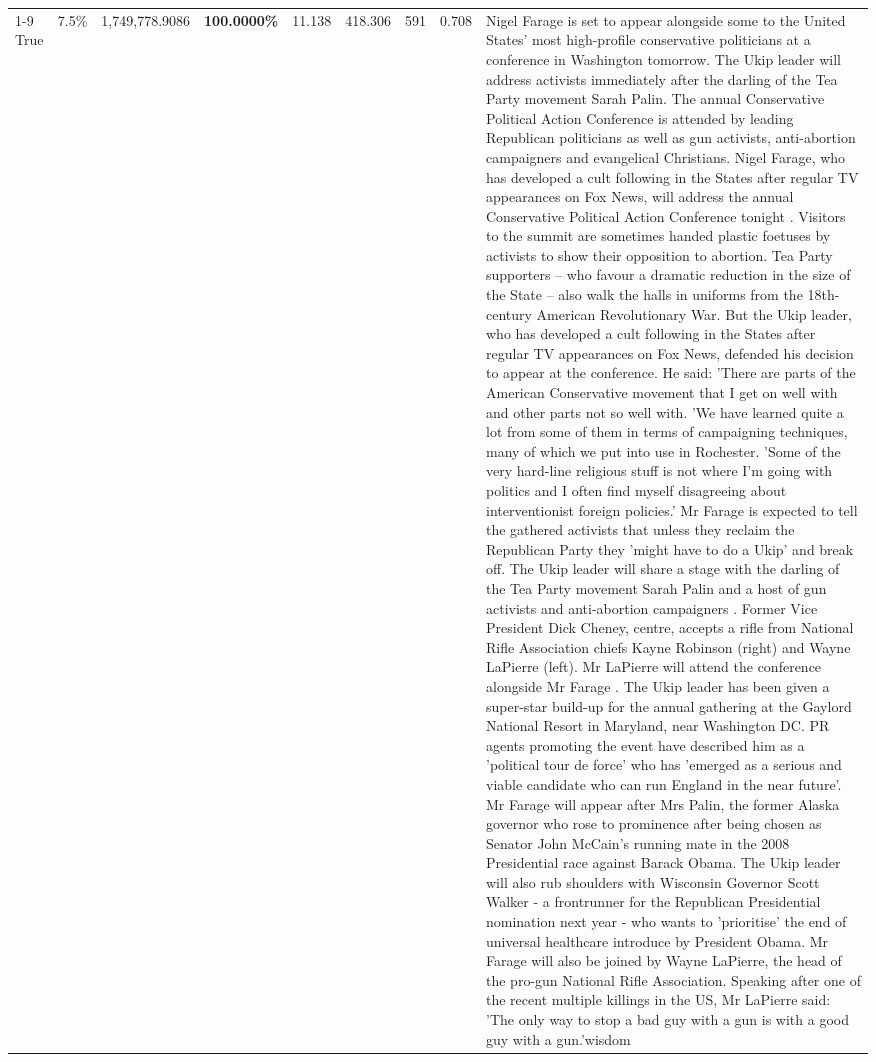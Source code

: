 \begin{table}[H]
\begin{tabular}{lllrlllll}
\cline{1-9}
True & 7.5\% & 1,749,778.9086 & \bfseries \color{red} 100.0000\% & 11.138 & 418.306 & 591 & 0.708 & Nigel Farage is set to appear alongside some to the United States' most high-profile conservative politicians at a conference in Washington tomorrow. The Ukip leader will address activists immediately after the darling of the Tea Party movement Sarah Palin. The annual Conservative Political Action Conference is attended by leading Republican politicians as well as gun activists, anti-abortion campaigners and evangelical Christians. Nigel Farage, who has developed a cult following in the States after regular TV appearances on Fox News, will address the annual Conservative Political Action Conference tonight . Visitors to the summit are sometimes handed plastic foetuses by activists to show their opposition to abortion. Tea Party supporters – who favour a dramatic reduction in the size of the State – also walk the halls in uniforms from the 18th-century American Revolutionary War. But the Ukip leader, who has developed a cult following in the States after regular TV appearances on Fox News, defended his decision to appear at the conference. He said: 'There are parts of the American Conservative movement that I get on well with and other parts not so well with. 'We have learned quite a lot from some of them in terms of campaigning techniques, many of which we put into use in Rochester. 'Some of the very hard-line religious stuff is not where I'm going with politics and I often find myself disagreeing about interventionist foreign policies.' Mr Farage is expected to tell the gathered activists that unless they reclaim the Republican Party they 'might have to do a Ukip' and break off. The Ukip leader will share a stage with the darling of the Tea Party movement Sarah Palin and a host of gun activists and anti-abortion campaigners . Former Vice President Dick Cheney, centre, accepts a rifle from National Rifle Association chiefs Kayne Robinson (right) and Wayne LaPierre (left). Mr LaPierre will attend the conference alongside Mr Farage . The Ukip leader has been given a super-star build-up for the annual gathering at the Gaylord National Resort in Maryland, near Washington DC. PR agents promoting the event have described him as a 'political tour de force' who has 'emerged as a serious and viable candidate who can run England in the near future'. Mr Farage will appear after Mrs Palin, the former Alaska governor who rose to prominence after being chosen as Senator John McCain's running mate in the 2008 Presidential race against Barack Obama. The Ukip leader will also rub shoulders with Wisconsin Governor Scott Walker - a frontrunner for the Republican Presidential nomination next year - who wants to 'prioritise' the end of universal healthcare introduce by President Obama. Mr Farage will also be joined by Wayne LaPierre, the head of the pro-gun National Rifle Association. Speaking after one of the recent multiple killings in the US, Mr LaPierre said: 'The only way to stop a bad guy with a gun is with a good guy with a gun.'wisdom \\

\end{tabular}
\end{table}
